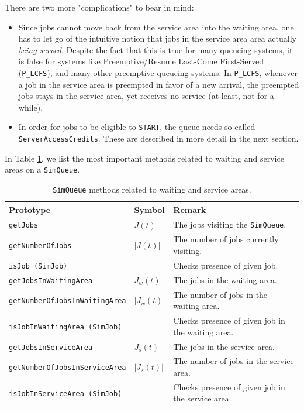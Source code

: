 There are two more "complications" to bear in mind:
\begin{itemize}
  \item Since jobs cannot move back from the service area
          into the waiting area,
          one has to let go of the intuitive notion that
          jobs in the service area area actually {\em being served}.
        Despite the fact that this is true for many queueing systems,
          it is false for systems like Preemptive/Resume Last-Come First-Served
          (\lstinline|P_LCFS|),
          and many other preemptive queueing systems.
        In \lstinline|P_LCFS|, whenever a job in the service area is preempted
          in favor of a new arrival,
          the preempted jobs stays in the service area,
          yet receives no service (at least, not for a while).
  \item In order for jobs to be eligible to \lstinline|START|,
          the queue needs so-called \lstinline|ServerAccessCredits|.
        These are described in more detail in the next section.
\end{itemize}

In Table \ref{simqueue-methods-areas},
  we list the most important methods related to waiting and service areas
  on a \lstinline|SimQueue|.

\begin{table}[h]
\caption{\texttt{SimQueue} methods related to waiting and service areas.}
\label{simqueue-methods-areas}
\begin{center}
\begin{tabular}{|l|l|l|}
\hline
Prototype & Symbol & Remark \\ \hline
\lstinline|getJobs|                      & $J(t)$      & The jobs visiting the \lstinline|SimQueue|.       \\ \hline
\lstinline|getNumberOfJobs|              & $|J(t)|$    & The number of jobs currently visiting.            \\ \hline
\lstinline|isJob (SimJob)|               &             & Checks presence of given job.                     \\ \hline
\lstinline|getJobsInWaitingArea|         & $J_w(t)$    & The jobs in the waiting area.                     \\ \hline
\lstinline|getNumberOfJobsInWaitingArea| & $|J_w(t)|$  & The number of jobs in the waiting area.           \\ \hline
\lstinline|isJobInWaitingArea (SimJob)|  &             & Checks presence of given job in the waiting area. \\ \hline
\lstinline|getJobsInServiceArea|         & $J_s(t)$    & The jobs in the service area.                     \\ \hline
\lstinline|getNumberOfJobsInServiceArea| & $|J_s(t)|$  & The number of jobs in the service area.           \\ \hline
\lstinline|isJobInServiceArea (SimJob)|  &             & Checks presence of given job in the service area. \\ \hline
\end{tabular}
\end{center}
\end{table}

